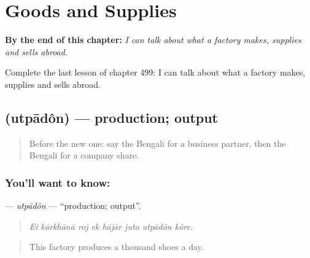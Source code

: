 
\chapter{Goods and Supplies}
\label{ch:bn-goods-and-supplies}

\begin{chapteropening}
\textbf{By the end of this chapter:} \emph{I can talk about what a factory makes, supplies and sells abroad.}

Complete the last lesson of chapter 499: I can talk about what a factory makes, supplies and sells abroad.
\end{chapteropening}

\section[\texorpdfstring{\bn{উৎপাদন} (utpādôn)}{উৎপাদন (utpādôn)}]{ (utpādôn) — production; output}

\label{lesson:BN-C499-utpadon}



\begin{quote}
Before the new one: say the Bengali for a business partner, then the Bengali for a company share.
\end{quote}

\subsection*{You'll want to know: }
\textbf{} — \emph{utpādôn} — \textquotedblleft{}production; output\textquotedblright{}.

\begin{quote}
       
\end{quote}

\begin{quote}
\emph{Ei kārkhānā roj ek hājār juto utpādôn kôre.}
\end{quote}

\begin{quote}
This factory produces a thousand shoes a day.
\end{quote}

